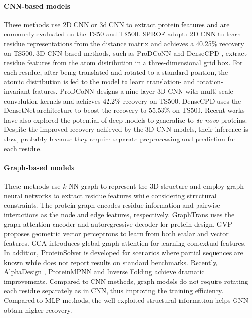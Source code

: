 \documentclass{article}
\begin{document}
\paragraph{CNN-based models} These methods use 2D CNN or 3d CNN to extract protein features \citep{torng20173d, NIPS2017_1113d7a7, NEURIPS2018_488e4104, zhang2020prodconn, qi2020densecpd, chen2019improve} and are commonly evaluated on the TS50 and TS500. SPROF \citep{chen2019improve} adopts 2D CNN to learn residue representations from the distance matrix and achieves a 40.25\% recovery on TS500. 3D CNN-based methods, such as ProDCoNN \citep{zhang2020prodconn} and  DenseCPD \citep{qi2020densecpd}, extract residue features from the atom distribution in a three-dimensional grid box. For each residue, after being translated and rotated to a standard position, the atomic distribution is fed to the model to learn translation- and rotation-invariant features. ProDCoNN \citep{zhang2020prodconn} designs a nine-layer 3D CNN with multi-scale convolution kernels and achieves 42.2\% recovery on TS500. DenseCPD \citep{qi2020densecpd} uses the DensetNet architecture \citep{huang2017densely} to boost the recovery to 55.53\% on TS500. Recent works \citep{anand2022protein} have also explored the potential of deep models to generalize to \textit{de novo} proteins. Despite the improved recovery achieved by the 3D CNN models, their inference is slow, probably because they require separate preprocessing and prediction for each residue.  
  

\vspace{-2mm}
\paragraph{Graph-based models} These methods use $k$-NN graph to represent the 3D structure and employ graph neural networks \citep{defferrard2016convolutional,kipf2016semi,velivckovic2017graph,zhou2020graph,zhang2020deep, gao2022cosp, tan2022target, gao2022semiretro} to extract residue features while considering structural constraints. The protein graph encodes residue information and pairwise interactions as the node and edge features, respectively. GraphTrans \citep{ingraham2019generative} uses the graph attention encoder and autoregressive decoder for protein design. GVP \citep{jing2020learning} proposes geometric vector perceptrons to learn from both scalar and vector features. GCA \citep{tan2022generative} introduces global graph attention for learning contextual features. In addition, ProteinSolver \citep{strokach2020fast} is developed for scenarios where partial sequences are known while does not report results on standard benchmarks. Recently, AlphaDesign \citep{gao2022alphadesign}, ProteinMPNN \citep{dauparas2022robust} and Inverse Folding \citep{hsu2022learning} achieve dramatic improvements. Compared to CNN methods, graph models do not require rotating each residue separately as in CNN, thus improving the training efficiency. Compared to MLP methods, the well-exploited structural information helps GNN obtain higher recovery. 
\end{document}
